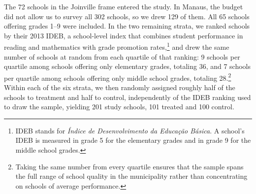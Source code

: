 The 72 schools in the Joinville frame entered the study. In Manaus, the budget did not allow us to survey all 302 schools, so we drew 129 of them. All 65 schools offering grades 1--9 were included. In the two remaining strata, we ranked schools by their 2013 IDEB, a school-level index that combines student performance in reading and mathematics with grade promotion rates,\footnote{IDEB stands for \textit{Índice de Desenvolvimento da Educação Básica}. A school's IDEB is measured in grade 5 for the elementary grades and in grade 9 for the middle school grades.} and drew the same number of schools at random from each quartile of that ranking: 9 schools per quartile among schools offering only elementary grades, totaling 36, and 7 schools per quartile among schools offering only middle school grades, totaling 28.\footnote{Taking the same number from every quartile ensures that the sample spans the full range of school quality in the municipality rather than concentrating on schools of average performance.} Within each of the six strata, we then randomly assigned roughly half of the schools to treatment and half to control, independently of the IDEB ranking used to draw the sample, yielding 201 study schools, 101 treated and 100 control.

